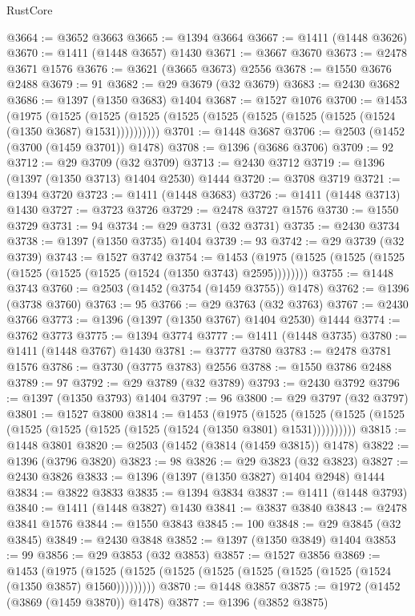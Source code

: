 \begin{lexlean}{RustCore}
\begin{coremodule}
@3664 := @3652 @3663
@3665 := @1394 @3664
@3667 := @1411 (@1448 @3626)
@3670 := @1411 (@1448 @3657) @1430
@3671 := @3667 @3670
@3673 := @2478 @3671 @1576
@3676 := @3621 (@3665 @3673) @2556
@3678 := @1550 @3676 @2488
@3679 := 91
@3682 := @29 @3679 (@32 @3679)
@3683 := @2430 @3682
@3686 := @1397 (@1350 @3683) @1404
@3687 := @1527 @1076
@3700 := @1453
    (@1975
      (@1525 (@1525 (@1525 (@1525 (@1525 (@1525 (@1525 (@1525 (@1524 (@1350 @3687) @1531))))))))))
@3701 := @1448 @3687
@3706 := @2503 (@1452 (@3700 (@1459 @3701)) @1478)
@3708 := @1396 (@3686 @3706)
@3709 := 92
@3712 := @29 @3709 (@32 @3709)
@3713 := @2430 @3712
@3719 := @1396 (@1397 (@1350 @3713) @1404 @2530) @1444
@3720 := @3708 @3719
@3721 := @1394 @3720
@3723 := @1411 (@1448 @3683)
@3726 := @1411 (@1448 @3713) @1430
@3727 := @3723 @3726
@3729 := @2478 @3727 @1576
@3730 := @1550 @3729
@3731 := 94
@3734 := @29 @3731 (@32 @3731)
@3735 := @2430 @3734
@3738 := @1397 (@1350 @3735) @1404
@3739 := 93
@3742 := @29 @3739 (@32 @3739)
@3743 := @1527 @3742
@3754 := @1453 (@1975 (@1525 (@1525 (@1525 (@1525 (@1525 (@1525 (@1524 (@1350 @3743) @2595))))))))
@3755 := @1448 @3743
@3760 := @2503 (@1452 (@3754 (@1459 @3755)) @1478)
@3762 := @1396 (@3738 @3760)
@3763 := 95
@3766 := @29 @3763 (@32 @3763)
@3767 := @2430 @3766
@3773 := @1396 (@1397 (@1350 @3767) @1404 @2530) @1444
@3774 := @3762 @3773
@3775 := @1394 @3774
@3777 := @1411 (@1448 @3735)
@3780 := @1411 (@1448 @3767) @1430
@3781 := @3777 @3780
@3783 := @2478 @3781 @1576
@3786 := @3730 (@3775 @3783) @2556
@3788 := @1550 @3786 @2488
@3789 := 97
@3792 := @29 @3789 (@32 @3789)
@3793 := @2430 @3792
@3796 := @1397 (@1350 @3793) @1404
@3797 := 96
@3800 := @29 @3797 (@32 @3797)
@3801 := @1527 @3800
@3814 := @1453
    (@1975
      (@1525 (@1525 (@1525 (@1525 (@1525 (@1525 (@1525 (@1525 (@1524 (@1350 @3801) @1531))))))))))
@3815 := @1448 @3801
@3820 := @2503 (@1452 (@3814 (@1459 @3815)) @1478)
@3822 := @1396 (@3796 @3820)
@3823 := 98
@3826 := @29 @3823 (@32 @3823)
@3827 := @2430 @3826
@3833 := @1396 (@1397 (@1350 @3827) @1404 @2948) @1444
@3834 := @3822 @3833
@3835 := @1394 @3834
@3837 := @1411 (@1448 @3793)
@3840 := @1411 (@1448 @3827) @1430
@3841 := @3837 @3840
@3843 := @2478 @3841 @1576
@3844 := @1550 @3843
@3845 := 100
@3848 := @29 @3845 (@32 @3845)
@3849 := @2430 @3848
@3852 := @1397 (@1350 @3849) @1404
@3853 := 99
@3856 := @29 @3853 (@32 @3853)
@3857 := @1527 @3856
@3869 := @1453
    (@1975 (@1525 (@1525 (@1525 (@1525 (@1525 (@1525 (@1525 (@1524 (@1350 @3857) @1560)))))))))
@3870 := @1448 @3857
@3875 := @1972 (@1452 (@3869 (@1459 @3870)) @1478)
@3877 := @1396 (@3852 @3875)

\end{coremodule}
\end{lexlean}
